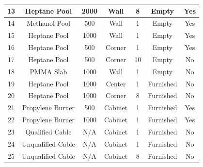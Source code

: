 \begin{table}[h!]
\begin{center}
\begin{tabular}{|c|c|c|c|c|c|c|}
13      & Heptane Pool      &    2000       & Wall          & 8                 & Empty                 &        Yes \\ \hline
14      & Methanol Pool     &     500       & Wall          & 1                 & Empty                 &        Yes \\ \hline
15      & Heptane Pool      &    1000       & Wall          & 1                 & Empty                 &        Yes \\ \hline
16      & Heptane Pool      &     500       & Corner        & 1                 & Empty                 &        Yes \\ \hline
17      & Heptane Pool      &     500       & Corner        & 10                & Empty                 &         No \\ \hline
18      &  PMMA Slab        &    1000       & Wall          & 1                 & Empty                 &         No \\ \hline
19      & Heptane Pool      &    1000       & Center        & 1                 & Furnished             &         No \\ \hline
20      & Heptane Pool      &    1000       & Corner        & 8                 & Furnished             &         No \\ \hline
21      & Propylene Burner  &     500       & Cabinet       & 1                 & Furnished             &        Yes \\ \hline
22      & Propylene Burner  &    1000       & Cabinet       & 1                 & Furnished             &        Yes \\ \hline
23      & Qualified Cable   &        N/A    & Cabinet       & 1                 & Furnished             &         No \\ \hline
24      & Unqualified Cable &        N/A    & Cabinet       & 1                 & Furnished             &         No \\ \hline
25      & Unqualified Cable &        N/A    & Cabinet       & 8                 & Furnished             &         No \\ \hline
\end{tabular}
\end{center}
\label{FM_SNL_Matrix}
\end{table}



